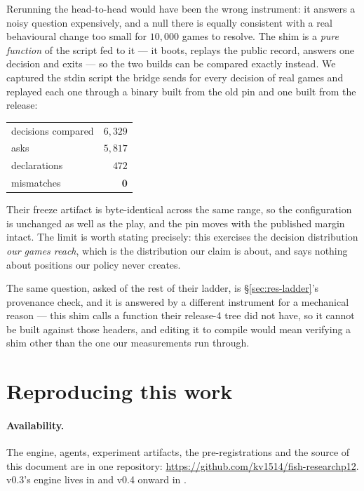 \documentclass[11pt,letterpaper]{article}
\begin{document}
Rerunning the head-to-head would have been the wrong instrument: it answers a
noisy question expensively, and a null there is equally consistent with a real
behavioural change too small for $10{,}000$ games to resolve. The shim is a
\emph{pure function} of the script fed to it --- it boots, replays the public
record, answers one decision and exits --- so the two builds can be compared
exactly instead. We captured the stdin script the bridge sends for every
decision of real games and replayed each one through a binary built from the
old pin and one built from the release:

\begin{center}
\small
\begin{tabular}{lr}
\toprule
decisions compared & $6{,}329$ \\
\quad asks & $5{,}817$ \\
\quad declarations & $472$ \\
mismatches & $\mathbf{0}$ \\
\bottomrule
\end{tabular}
\end{center}

\noindent Their freeze artifact is byte-identical across the same range, so the
configuration is unchanged as well as the play, and the pin moves with the
published margin intact. The limit is worth stating precisely: this exercises
the decision distribution \emph{our games reach}, which is the distribution our
claim is about, and says nothing about positions our policy never creates.

The same question, asked of the rest of their ladder, is
\S\ref{sec:res-ladder}'s provenance check, and it is answered by a different
instrument for a mechanical reason --- this shim calls a function their release-4
tree did not have, so it cannot be built against those headers, and editing it
to compile would mean verifying a shim other than the one our measurements run
through.

\section{Reproducing this work}
\label{sec:repro}
\label{app:repro}

\paragraph{Availability.} The engine, agents, experiment artifacts, the
pre-registrations and the source of this document are in one repository:
\url{https://github.com/kv1514/fish-researchp12}. v0.3's engine lives in
 and v0.4 onward in .
\end{document}
